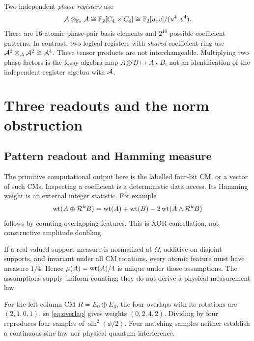 Two independent \emph{phase registers} use
\begin{equation}
 \mathcal A\otimes_{\mathbb F_2}\mathcal A\cong
 \mathbb F_2[C_4\times C_4]\cong\mathbb F_2[u,v]/(u^4,v^4).
\end{equation}
There are 16 atomic phase-pair basis elements and $2^{16}$ possible coefficient patterns. In contrast, two logical registers with \emph{shared} coefficient ring use $\mathcal A^2\otimes_{\mathcal A}\mathcal A^2\cong\mathcal A^4$. These tensor products are not interchangeable. Multiplying two phase factors is the lossy algebra map $A\otimes B\mapsto A\star B$, not an identification of the independent-register algebra with $\mathcal A$.

\section{Three readouts and the norm obstruction}\label{sec:norms}
\subsection{Pattern readout and Hamming measure}
The primitive computational output here is the labelled four-bit CM, or a vector of such CMs. Inspecting a coefficient is a deterministic data access. Its Hamming weight is an external integer statistic. For example
\begin{equation}\label{eq:overlap}
 \operatorname{wt}(A\oplus\mathcal R^kB)=\operatorname{wt}(A)+\operatorname{wt}(B)-2\operatorname{wt}(A\land\mathcal R^kB)
\end{equation}
follows by counting overlapping features. This is XOR cancellation, not constructive amplitude doubling.

If a real-valued support measure is normalized at $\Omega$, additive on disjoint supports, and invariant under all CM rotations, every atomic feature must have measure $1/4$. Hence $\mu(A)=\operatorname{wt}(A)/4$ is unique under those assumptions. The assumptions supply uniform counting; they do not derive a physical measurement law.

For the left-column CM $R=E_0\oplus E_3$, the four overlaps with its rotations are $(2,1,0,1)$, so \cref{eq:overlap} gives weights $(0,2,4,2)$. Dividing by four reproduces four samples of $\sin^2(\phi/2)$. Four matching samples neither establish a continuous sine law nor physical quantum interference.

